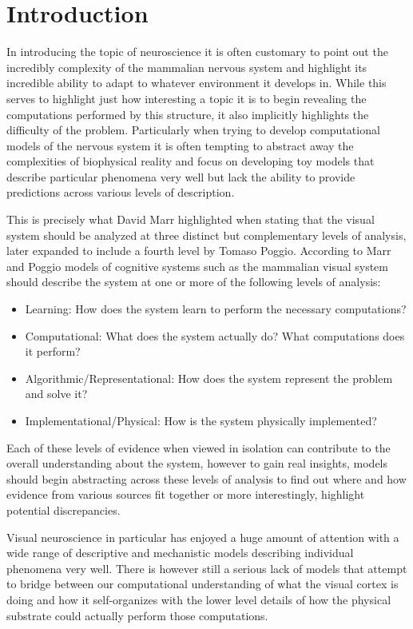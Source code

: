 \chapter{Introduction}

In introducing the topic of neuroscience it is often customary to
point out the incredibly complexity of the mammalian nervous system
and highlight its incredible ability to adapt to whatever environment
it develops in. While this serves to highlight just how interesting a
topic it is to begin revealing the computations performed by this
structure, it also implicitly highlights the difficulty of the
problem. Particularly when trying to develop computational models of
the nervous system it is often tempting to abstract away the
complexities of biophysical reality and focus on developing toy models
that describe particular phenomena very well but lack the ability to
provide predictions across various levels of description.

This is precisely what David Marr highlighted when stating that the
visual system should be analyzed at three distinct but complementary
levels of analysis, later expanded to include a fourth level by Tomaso
Poggio. According to Marr and Poggio models of cognitive systems such
as the mammalian visual system should describe the system at one or
more of the following levels of analysis:

\begin{itemize}
\item Learning: How does the system learn to perform the necessary computations?
\item Computational: What does the system actually do? What computations does it perform?
\item Algorithmic/Representational: How does the system represent the problem and solve it?
\item Implementational/Physical: How is the system physically implemented?
\end{itemize}

Each of these levels of evidence when viewed in isolation can
contribute to the overall understanding about the system, however to
gain real insights, models should begin abstracting across these
levels of analysis to find out where and how evidence from various
sources fit together or more interestingly, highlight potential
discrepancies.

Visual neuroscience in particular has enjoyed a huge amount of
attention with a wide range of descriptive and mechanistic models
describing individual phenomena very well. There is however still a
serious lack of models that attempt to bridge between our
computational understanding of what the visual cortex is doing and how
it self-organizes with the lower level details of how the physical
substrate could actually perform those computations.

